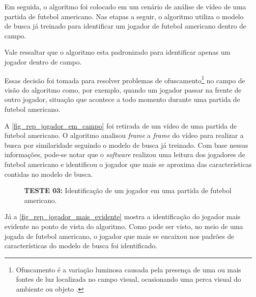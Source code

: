 Em seguida, o algoritmo foi colocado em um cenário de análise de vídeo de uma partida de futebol americano. Nas etapas a seguir, o algoritmo utiliza o modelo de busca já treinado para identificar um jogador de futebol americano dentro de campo.

Vale ressaltar que o algoritmo esta padronizado para identificar apenas um jogador dentro de campo.

Essas decisão foi tomada para resolver problemas de ofuscamento\footnote{Ofuscamento é a variação luminosa causada pela presença de uma ou mais fontes de luz localizada no campo visual, ocasionando uma perca visual do ambiente ou objeto \cite{LACAVA1999}.} no campo de visão do algoritmo como, por exemplo, quando um jogador passar na frente de outro jogador, situação que acontece a todo momento durante uma partida de futebol americano.

A \autoref{fig_rep_jogador_em_campo} foi retirada de um vídeo de uma partida de futebol americano. O algoritmo analisou \textit{frame} a \textit{frame} do vídeo para realizar a busca por similaridade seguindo o modelo de busca já treinado. Com base nessas informações, pode-se notar que o \textit{software} realizou uma leitura dos jogadores de futebol americano e identificou o jogador que mais se aproxima das características contidas no modelo de busca.

\begin{figure}[ht]
	\caption{\label{fig_rep_jogador_em_campo}\textbf{TESTE 03:} Identificação de um jogador em uma partida de futebol americano.}
	\begin{center}
	\end{center}
	\centering {}
\end{figure}


Já a \autoref{fig_rep_jogador_mais_evidente} mostra a identificação do jogador mais evidente no ponto de vista do algoritmo. Como pode ser visto, no meio de uma jogada de futebol americano, o jogador que mais se encaixou nos padrões de características do modelo de busca foi identificado.

